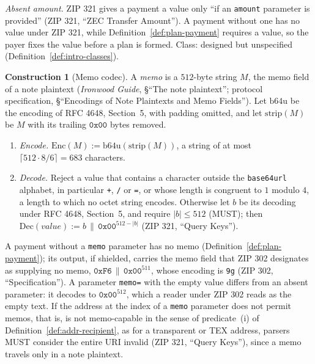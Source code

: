 \documentclass[11pt,a4paper]{article}
\theoremstyle{definition}
\newtheorem{construction}[theorem]{Construction}
\begin{document}
\emph{Absent amount.} ZIP 321 gives a payment a value only ``if an
\texttt{amount} parameter is provided'' (ZIP 321, ``ZEC Transfer
Amount''). A payment without one has no value under ZIP 321, while
Definition~\ref{def:plan-payment} requires a value, so the payer fixes the
value before a plan is formed. Class: designed but unspecified
(Definition~\ref{def:intro-classes}).

\begin{construction}[Memo codec]\label{def:zip321-memo}
A \emph{memo} is a $512$-byte string $M$, the memo field of a note
plaintext (\emph{Ironwood Guide}, \S``The note plaintext''; protocol
specification, \S``Encodings of Note Plaintexts and Memo Fields''). Let
$\mathrm{b64u}$ be the encoding of RFC 4648, Section~5, with padding
omitted, and let $\mathrm{strip}(M)$ be $M$ with its trailing
$\mathtt{0x00}$ bytes removed.
\begin{enumerate}[label=(\arabic*)]
\item \emph{Encode.} $\mathrm{Enc}(M) := \mathrm{b64u}(\mathrm{strip}(M))$,
  a string of at most $\lceil 512 \cdot 8 / 6 \rceil = 683$ characters.
\item \emph{Decode.} Reject a value that contains a character outside the
  \texttt{base64url} alphabet, in particular \texttt{+}, \texttt{/} or
  \texttt{=}, or whose length is congruent to $1$ modulo $4$, a length to
  which no octet string encodes. Otherwise let $b$ be its decoding under
  RFC 4648, Section~5, and require $|b| \le 512$ (MUST); then
  $\mathrm{Dec}(\mathit{value}) := b \,\|\, \mathtt{0x00}^{512 - |b|}$
  (ZIP 321, ``Query Keys'').
\end{enumerate}
A payment without a \texttt{memo} parameter has no memo
(Definition~\ref{def:plan-payment}); its output, if shielded, carries the
memo field that ZIP 302 designates as supplying no memo,
$\mathtt{0xF6} \,\|\, \mathtt{0x00}^{511}$, whose encoding is \texttt{9g}
(ZIP 302, ``Specification''). A parameter \texttt{memo=} with the empty
value differs from an absent parameter: it decodes to
$\mathtt{0x00}^{512}$, which a reader under ZIP 302 reads as the empty
text. If the address at the index of a \texttt{memo} parameter does not
permit memos, that is, is not memo-capable in the sense of predicate~(i)
of Definition~\ref{def:addr-recipient}, as for a transparent or TEX
address, parsers MUST consider the entire URI invalid (ZIP 321, ``Query
Keys''), since a memo travels only in a note plaintext.
\end{construction}
\end{document}
